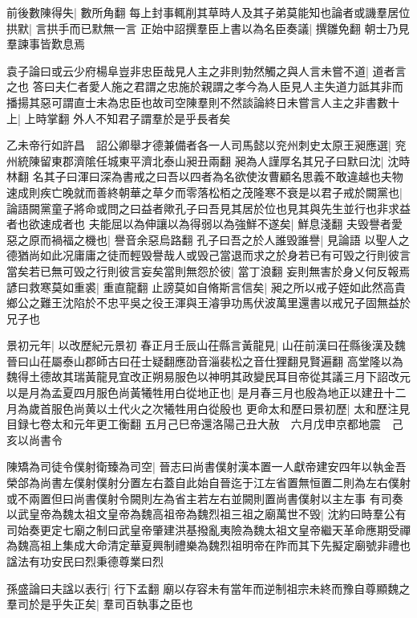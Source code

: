 前後數陳得失|{
	數所角翻}
每上封事輒削其草時人及其子弟莫能知也論者或譏羣居位拱默|{
	言拱手而已默無一言}
正始中詔撰羣臣上書以為名臣奏議|{
	撰雛免翻}
朝士乃見羣諫事皆歎息焉

袁子論曰或云少府楊阜豈非忠臣哉見人主之非則勃然觸之與人言未嘗不道|{
	道者言之也}
答曰夫仁者愛人施之君謂之忠施於親謂之孝今為人臣見人主失道力詆其非而播揚其惡可謂直士未為忠臣也故司空陳羣則不然談論終日未嘗言人主之非書數十上|{
	上時掌翻}
外人不知君子謂羣於是乎長者矣

乙未帝行如許昌　詔公卿舉才德兼備者各一人司馬懿以兖州刺史太原王昶應選|{
	兖州統陳留東郡濟隂任城東平濟北泰山昶丑兩翻}
昶為人謹厚名其兄子曰默曰沈|{
	沈時林翻}
名其子曰渾曰深為書戒之曰吾以四者為名欲使汝曹顧名思義不敢違越也夫物速成則疾亡晚就而善終朝華之草夕而零落松栢之茂隆寒不衰是以君子戒於闕黨也|{
	論語闕黨童子將命或問之曰益者歟孔子曰吾見其居於位也見其與先生並行也非求益者也欲速成者也}
夫能屈以為伸讓以為得弱以為強鮮不遂矣|{
	鮮息淺翻}
夫毁譽者愛惡之原而禍福之機也|{
	譽音余惡烏路翻}
孔子曰吾之於人誰毁誰譽|{
	見論語}
以聖人之德猶尚如此况庸庸之徒而輕毁譽哉人或毁己當退而求之於身若已有可毁之行則彼言當矣若已無可毁之行則彼言妄矣當則無怨於彼|{
	當丁浪翻}
妄則無害於身乂何反報焉諺曰救寒莫如重裘|{
	重直龍翻}
止謗莫如自脩斯言信矣|{
	昶之所以戒子姪如此然高貴鄉公之難王沈陷於不忠平吳之役王渾與王濬爭功馬伏波萬里還書以戒兄子固無益於兄子也}


景初元年|{
	以改歷紀元景初}
春正月壬辰山茌縣言黃龍見|{
	山茌前漢曰茌縣後漢及魏晉曰山茌屬泰山郡師古曰茌士疑翻應劭音淄裴松之音仕狸翻見賢遍翻}
高堂隆以為魏得土德故其瑞黃龍見宜改正朔易服色以神明其政變民耳目帝從其議三月下詔改元以是月為孟夏四月服色尚黃犧牲用白從地正也|{
	是月春三月也殷為地正以建丑十二月為歲首服色尚黄以土代火之次犧牲用白從殷也}
更命太和歷曰景初歷|{
	太和歷注見目録七卷太和元年更工衡翻}
五月己巳帝還洛陽己丑大赦　六月戊申京都地震　己亥以尚書令

陳矯為司徒令僕射衛臻為司空|{
	晉志曰尚書僕射漢本置一人獻帝建安四年以執金吾榮郃為尚書左僕射僕射分置左右蓋自此始自晉迄于江左省置無恒置二則為左右僕射或不兩置但曰尚書僕射令闕則左為省主若左右並闕則置尚書僕射以主左事}
有司奏以武皇帝為魏太祖文皇帝為魏高祖帝為魏烈祖三祖之廟萬世不毁|{
	沈約曰時羣公有司始奏更定七廟之制曰武皇帝肇建洪基撥亂夷險為魏太祖文皇帝繼天革命應期受禪為魏高祖上集成大命清定華夏興制禮樂為魏烈祖明帝在阼而其下先擬定廟號非禮也諡法有功安民曰烈秉德尊業曰烈}


孫盛論曰夫諡以表行|{
	行下孟翻}
廟以存容未有當年而逆制祖宗未終而豫自尊顯魏之羣司於是乎失正矣|{
	羣司百執事之臣也}


